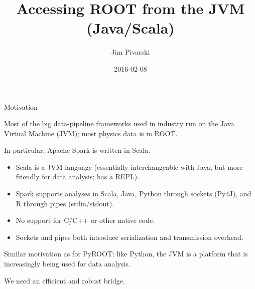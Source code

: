 \documentclass{beamer}
\title[2016-02-08-ROOT-JVM-firsttalk]{Accessing ROOT from the JVM (Java/Scala)}
\author{Jim Pivarski}
\date{2016-02-08}
\begin{document}
\begin{frame}
  \titlepage
\end{frame}


\begin{frame}{Motivation}
\begin{block}{}
\vspace{-\baselineskip}
Most of the big data-pipeline frameworks used in industry run on the Java Virtual Machine (JVM); most physics data is in ROOT.
\end{block}

\begin{block}{}
\vspace{-\baselineskip}
In particular, Apache Spark is written in Scala.
\begin{itemize}
\item Scala is a JVM language (essentially interchangeable with Java, but more friendly for data analysis; has a REPL).
\item Spark supports analyses in Scala, Java, Python through sockets (Py4J), and R through pipes (stdin/stdout).
\item No support for C/C++ or other native code.
\item Sockets and pipes both introduce serialization and transmission overhead.
\end{itemize}
\end{block}

\begin{block}{}
\vspace{-\baselineskip}
Similar motivation as for PyROOT: like Python, the JVM is a platform that is increasingly being used for data analysis.

\vspace{0.5\baselineskip}
We need an efficient and robust bridge.
\end{block}
\end{frame}
\end{document}
